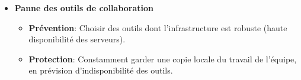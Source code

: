 \begin{itemize}
  \item \textbf{Panne des outils de collaboration}
        \begin{itemize}
          \item \textbf{Prévention}: Choisir des outils dont l'infrastructure est robuste (haute disponibilité des serveurs).
          \item \textbf{Protection}: Constamment garder une copie locale du travail de l'équipe, en prévision d'indisponibilité des outils.
        \end{itemize}

\end{itemize}

